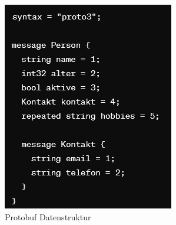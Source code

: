 \begin{figure}[]
	\centering
	\begin{minipage}{0.48\textwidth}
		\centering
		\includegraphics[width=\textwidth]{figures/protobufexample.png}
		\caption{Protobuf Datenstruktur}
		\label{fig:protobuf}
	\end{minipage}\hfill
	\begin{minipage}{0.48\textwidth}
		\centering

\end{minipage}
\end{figure}
